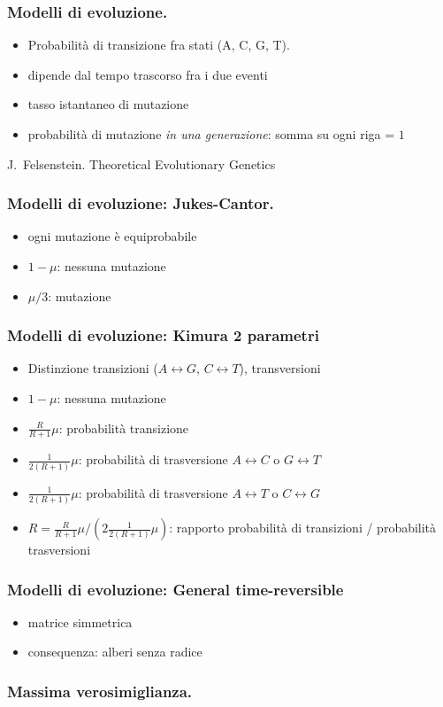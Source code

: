 \begin{frame}[fragile]
  \frametitle{Modelli di evoluzione.}
\begin{itemize}
\item
  Probabilità di transizione fra stati (A, C, G, T).
\item
  dipende dal tempo trascorso fra i due eventi
\item
  tasso istantaneo di mutazione
\item
  probabilità di mutazione \emph{in una generazione}: somma su ogni riga = $1$
\end{itemize}

J.~Felsenstein.
%
 Theoretical Evolutionary Genetics
\end{frame}

\begin{frame}[fragile]
  \frametitle{Modelli di evoluzione: Jukes-Cantor.}
\begin{itemize}
\item
  ogni mutazione è equiprobabile
\item
  $1-\mu$: nessuna mutazione
\item
  $\mu/3$: mutazione
\end{itemize}
\end{frame}

\begin{frame}[fragile]
  \frametitle{Modelli di evoluzione: Kimura 2 parametri}
\begin{itemize}
\item
  Distinzione transizioni ($A\leftrightarrow G$, $C\leftrightarrow T$), transversioni
\item
  $1-\mu$: nessuna mutazione
\item
  $\frac{R}{R+1}\mu$: probabilità transizione
\item
  $\frac{1}{2(R+1)}\mu$: probabilità di trasversione $A\leftrightarrow C$ o $G\leftrightarrow T$
\item
  $\frac{1}{2(R+1)}\mu$: probabilità di trasversione $A\leftrightarrow T$ o $C\leftrightarrow G$
\item
  $R = \frac{R}{R+1}\mu / \left(2 \frac{1}{2(R+1)}\mu \right)$: rapporto probabilità di transizioni / probabilità trasversioni
\end{itemize}
\end{frame}

\begin{frame}[fragile]
  \frametitle{Modelli di evoluzione: General time-reversible}
\begin{itemize}
\item
  matrice simmetrica
\item
  consequenza: alberi senza radice
\end{itemize}
\end{frame}


\begin{frame}[fragile]
\frametitle{Massima verosimiglianza.}
\end{frame}




